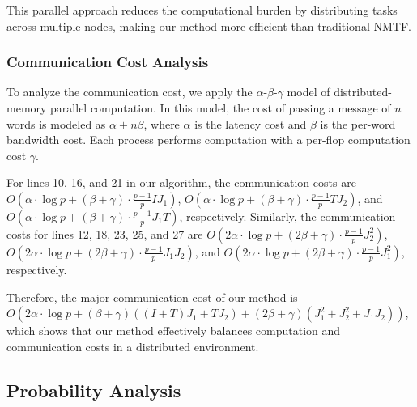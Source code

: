 \documentclass[journal]{IEEEtran}
\begin{document}
This parallel approach reduces the computational burden by distributing tasks across multiple nodes, making our method more efficient than traditional NMTF.

\subsubsection{Communication Cost Analysis}

To analyze the communication cost, we apply the $\alpha$-$\beta$-$\gamma$ model of distributed-memory parallel computation. In this model, the cost of passing a message of $n$ words is modeled as $\alpha + n\beta$, where $\alpha$ is the latency cost and $\beta$ is the per-word bandwidth cost. Each process performs computation with a per-flop computation cost $\gamma$.


For lines 10, 16, and 21 in our algorithm, the communication costs are $O(\alpha \cdot \log p + (\beta + \gamma) \cdot \frac{p-1}{p} IJ_1)$, $O(\alpha \cdot \log p + (\beta + \gamma) \cdot \frac{p-1}{p} TJ_2)$, and $O(\alpha \cdot \log p + (\beta + \gamma) \cdot \frac{p-1}{p} J_1T)$, respectively. Similarly, the communication costs for lines 12, 18, 23, 25, and 27 are $O(2\alpha \cdot \log p + (2\beta + \gamma) \cdot \frac{p-1}{p} J_2^2)$, $O(2\alpha \cdot \log p + (2\beta + \gamma) \cdot \frac{p-1}{p} J_1J_2)$, and $O(2\alpha \cdot \log p + (2\beta + \gamma) \cdot \frac{p-1}{p} J_1^2)$, respectively.

Therefore, the major communication cost of our method is $O(2\alpha \cdot \log p + (\beta + \gamma)((I + T)J_1 + TJ_2) + (2\beta + \gamma)(J_1^2 + J_2^2 + J_1J_2))$, which shows that our method effectively balances computation and communication costs in a distributed environment.

\subsection{Probability Analysis}
\end{document}
